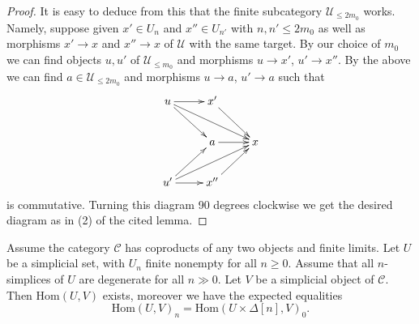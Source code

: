\begin{proof}
\medskip\noindent
It is easy to deduce from this that the finite subcategory
$\mathcal{U}_{\leq 2m_0}$ works. Namely, suppose given
$x' \in U_n$ and $x'' \in U_{n'}$ with $n, n' \leq 2m_0$ as well as
morphisms $x' \to x$ and $x'' \to x$ of $\mathcal{U}$
with the same target. By our choice of $m_0$ we can
find objects $u, u'$ of $\mathcal{U}_{\leq m_0}$ and
morphisms $u \to x'$, $u' \to x''$.
By the above we can find $a \in \mathcal{U}_{\leq 2m_0}$
and morphisms $u \to a$, $u' \to a$ such that
$$
\xymatrix{
u \ar[rd] \ar[rrd] \ar[r] & x' \ar[rd] & \\
& a \ar[r] & x \\
u' \ar[ru] \ar[rru] \ar[r] & x'' \ar[ru] &
}
$$
is commutative. Turning this diagram 90 degrees clockwise
we get the desired diagram as in (2) of the
cited lemma.
\end{proof}

\begin{lemma}
\label{lemma-exists-hom-from-simplicial-set-finite}
Assume the category $\mathcal{C}$
has coproducts of any two objects and finite
limits. Let $U$ be a simplicial set, with $U_n$ finite nonempty
for all $n \geq 0$. Assume that all $n$-simplices
of $U$ are degenerate for all $n \gg 0$.
Let $V$ be a simplicial object of $\mathcal{C}$.
Then $\text{Hom}(U, V)$ exists, moreover
we have the expected equalities
$$
\text{Hom}(U, V)_n = \text{Hom}(U \times \Delta[n], V)_0.
$$
\end{lemma}

